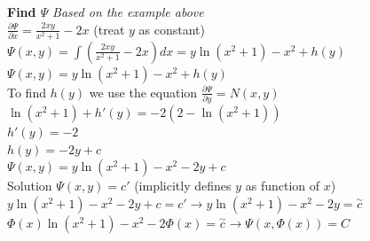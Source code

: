 \documentclass{article}
\begin{document}
\textbf{Find $\Psi$}
\newpage
\textit{Based on the example above}\\
$\frac{\partial\Psi}{\partial x}=\frac{2xy}{x^2+1}-2x$ (treat $y$ as constant)\\
$\Psi(x,y)=\int(\frac{2xy}{x^2+1}-2x)dx=y\ln(x^2+1)-x^2+h(y)$\\
$\Psi(x,y)=y\ln(x^2+1)-x^2+h(y)$\\
To find $h(y)$ we use the equation $\frac{\partial\Psi}{\partial y}=N(x,y)$\\
$\ln(x^2+1)+h'(y)=-2(2-\ln(x^2+1))$\\
$h'(y)=-2$\\
$h(y)=-2y+c$\\
$\Psi(x,y)=y\ln(x^2+1)-x^2-2y+c$\\
Solution $\Psi(x,y)=c'$ (implicitly defines $y$ as function of $x$)\\
$y\ln(x^2+1)-x^2-2y+c=c'\rightarrow y\ln(x^2+1)-x^2-2y=\overset{\sim}{c}$\\
$\Phi(x)\ln(x^2+1)-x^2-2\Phi(x)=\overset{\sim}{c}\rightarrow \Psi(x,\Phi(x))=C$
\end{document}
